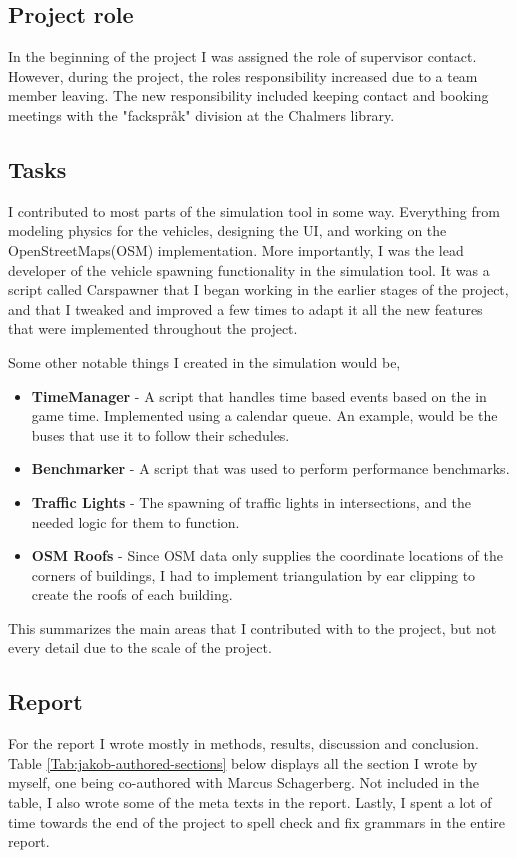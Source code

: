 \subsection{Project role}
    In the beginning of the project I was assigned the role of supervisor contact. However, during the project, the roles responsibility increased due to a team member leaving. The new responsibility included keeping contact and booking meetings with the "fackspråk" division at the Chalmers library.
    
\subsection{Tasks}
    I contributed to most parts of the simulation tool in some way. Everything from modeling physics for the vehicles, designing the UI, and working on the OpenStreetMaps(OSM) implementation. More importantly, I was the lead developer of the vehicle spawning functionality in the simulation tool. It was a script called Carspawner that I began working in the earlier stages of the project, and that I tweaked and improved a few times to adapt it all the new features that were implemented throughout the project. 
    
    Some other notable things I created in the simulation would be,

    \begin{itemize}
        \item \textbf{TimeManager} - A script that handles time based events based on the in game time. Implemented using a calendar queue. An example, would be the buses that use it to follow their schedules.
        \item \textbf{Benchmarker} - A script that was used to perform performance benchmarks.
        \item \textbf{Traffic Lights} - The spawning of traffic lights in intersections, and the needed logic for them to function.
        \item \textbf{OSM Roofs} - Since OSM data only supplies the coordinate locations of the corners of buildings, I had to implement triangulation by ear clipping to create the roofs of each building.
        
    \end{itemize}

    This summarizes the main areas that I contributed with to the project, but not every detail due to the scale of the project. 

\subsection{Report}
    For the report I wrote mostly in methods, results, discussion and conclusion. Table \ref{Tab:jakob-authored-sections} below displays all the section I wrote by myself, one being co-authored with Marcus Schagerberg. Not included in the table, I also wrote some of the meta texts in the report. Lastly, I spent a lot of time towards the end of the project to spell check and fix grammars in the entire report. 
    
